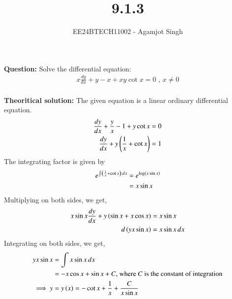 \documentclass[journal]{IEEEtran}
\begin{document}

\vspace{3cm}

\title{9.1.3}
\author{EE24BTECH11002 - Agamjot Singh}
{\let\newpage\relax\maketitle}

\renewcommand{\thefigure}{\theenumi}
\renewcommand{\thetable}{\theenumi}
\setlength{\intextsep}{10pt} %

\textbf{Question:}
\newline
Solve the differential equation:
\begin{align}
    x\frac{dy}{dx} + y - x + xy \cot{x} = 0 \text{ , } x\neq 0\\
\end{align}

\textbf{Theoritical solution:}
The given equation is a linear ordinary differential equation.
\begin{align}
    \frac{dy}{dx} + \frac{y}{x} - 1 + y \cot{x} = 0\\
    \frac{dy}{dx} + y \left(\frac{1}{x} + \cot{x}\right) = 1
\end{align}
The integrating factor is given by 
\begin{align}
    e^{\int \left(\frac{1}{x} + \cot{x}\right) \, dx} &= e^{\log \left(x \sin{x}\right)}\\
                                                &= x \sin {x}
\end{align}
Multiplying on both sides, we get,
\begin{align}
    x\sin{x}\frac{dy}{dx} + y\left(\sin{x} + x\cos{x}\right) &= x\sin{x}\\
    d\left(y x\sin{x}\right) &= x\sin{x} \, dx
\end{align}
Integrating on both sides, we get,
\begin{align}
    y x\sin{x} &= \int x\sin{x} \, dx\\
               &= -x\cos{x} + \sin{x} + C \text{, where } C \text{ is the constant of integration}\\
    \implies y &= y\left(x\right) = -\cot{x} + \frac{1}{x} + \frac{C}{x\sin{x}}
\end{align}
\end{document}
